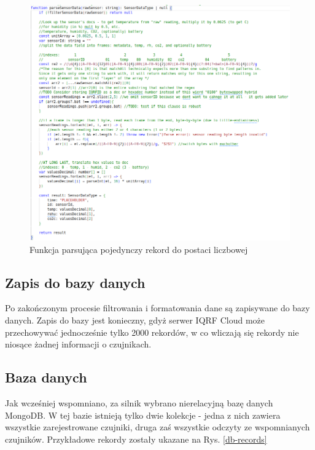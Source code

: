 \begin{figure}[H]
    \includegraphics[width=\textwidth]{zdj/app/parse-sensor.png}
    \caption{Funkcja parsująca pojedynczy rekord do postaci liczbowej}
    \label{record-after-parsing}
\end{figure}

\subsection{Zapis do bazy danych}

Po zakończonym procesie filtrowania i formatowania dane są zapisywane do bazy danych. Zapis do bazy jest konieczny, gdyż serwer IQRF Cloud może przechowywać
jednocześnie tylko 2000 rekordów, w co wliczają się rekordy nie niosące żadnej informacji o czujnikach.

\subsection{Baza danych}

Jak wcześniej wspomniano, za silnik wybrano nierelacyjną bazę danych MongoDB. W tej bazie istnieją tylko dwie kolekcje - jedna z nich zawiera wszystkie zarejestrowane 
czujniki, druga zaś wszystkie odczyty ze wspomnianych czujników. Przykładowe rekordy zostały ukazane na Rys. \ref{db-records}

